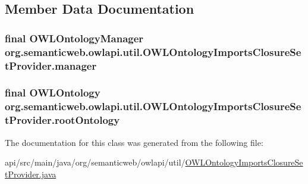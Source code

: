 \subsection{Member Data Documentation}
\hypertarget{classorg_1_1semanticweb_1_1owlapi_1_1util_1_1_o_w_l_ontology_imports_closure_set_provider_a7c67738303fa5ecfad7bc8e4453ace31}{
\subsubsection[{manager}]{\setlength{\rightskip}{0pt plus 5cm}final {\bf O\-W\-L\-Ontology\-Manager} org.\-semanticweb.\-owlapi.\-util.\-O\-W\-L\-Ontology\-Imports\-Closure\-Set\-Provider.\-manager\hspace{0.3cm}{\ttfamily [private]}}}\label{classorg_1_1semanticweb_1_1owlapi_1_1util_1_1_o_w_l_ontology_imports_closure_set_provider_a7c67738303fa5ecfad7bc8e4453ace31}
\hypertarget{classorg_1_1semanticweb_1_1owlapi_1_1util_1_1_o_w_l_ontology_imports_closure_set_provider_ae8ead5c763d1a12663824ad7786f3b82}{
\subsubsection[{root\-Ontology}]{\setlength{\rightskip}{0pt plus 5cm}final {\bf O\-W\-L\-Ontology} org.\-semanticweb.\-owlapi.\-util.\-O\-W\-L\-Ontology\-Imports\-Closure\-Set\-Provider.\-root\-Ontology\hspace{0.3cm}{\ttfamily [private]}}}\label{classorg_1_1semanticweb_1_1owlapi_1_1util_1_1_o_w_l_ontology_imports_closure_set_provider_ae8ead5c763d1a12663824ad7786f3b82}


The documentation for this class was generated from the following file\-:\begin{DoxyCompactItemize}
\item 
api/src/main/java/org/semanticweb/owlapi/util/\hyperlink{_o_w_l_ontology_imports_closure_set_provider_8java}{O\-W\-L\-Ontology\-Imports\-Closure\-Set\-Provider.\-java}\end{DoxyCompactItemize}
